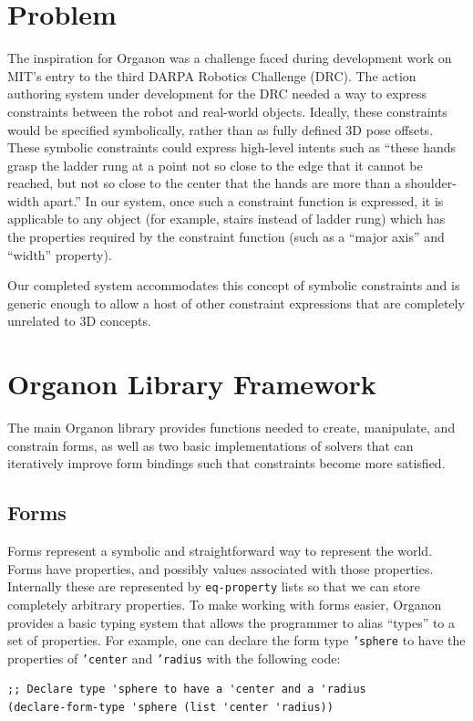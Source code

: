 \documentclass[12pt,a4paper]{article}
\begin{document}
\section{Problem}
The inspiration for Organon was a challenge faced during development work on MIT's entry to the third DARPA Robotics Challenge (DRC). The action authoring system under development for the DRC needed a way to express constraints between the robot and real-world objects. Ideally, these constraints would be specified symbolically, rather than as fully defined 3D pose offsets. These symbolic constraints could express high-level intents such as ``these hands grasp the ladder rung at a point not so close to the edge that it cannot be reached, but not so close to the center that the hands are more than a shoulder-width apart.'' In our system, once such a constraint function is expressed, it is applicable to any object (for example, stairs instead of  ladder rung) which has the properties required by the constraint function (such as a ``major axis'' and ``width'' property).

Our completed system accommodates this concept of symbolic constraints and is generic enough to allow a host of other constraint expressions that are completely unrelated to 3D concepts.

\section{Organon Library Framework}
The main Organon library provides functions needed to create, manipulate, and constrain forms, as well as two basic implementations of solvers that can iteratively improve form bindings such that constraints become more satisfied.  

\subsection{Forms}
Forms represent a symbolic and straightforward way to represent the world.  Forms have properties, and possibly values associated with those properties.  Internally these are represented by \texttt{eq-property} lists so that we can store completely arbitrary properties.  To make working with forms easier, Organon provides a basic typing system that allows the programmer to alias ``types'' to a set of properties. For example, one can declare the form type \texttt{'sphere} to have the properties of \texttt{'center} and \texttt{'radius} with the following code:

\begin{lstlisting}
;; Declare type 'sphere to have a 'center and a 'radius
(declare-form-type 'sphere (list 'center 'radius)) 
\end{lstlisting}
\end{document}
